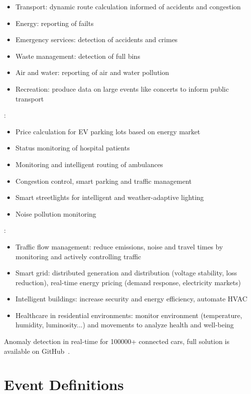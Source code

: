 \documentclass[]{scrartcl}
\begin{document}
\cite[p.~7~f.]{Petrolo.2017}
\begin{itemize}
	\item Transport: dynamic route calculation informed of accidents and congestion
	\item Energy: reporting of failts
	\item Emergency services: detection of accidents and crimes
	\item Waste management: detection of full bins
	\item Air and water: reporting of air and water pollution
	\item Recreation: produce data on large events like concerts to inform public transport
\end{itemize}

\cite[p.~8~ff.]{Alavi.2018}:
\begin{itemize}
	\item Price calculation for EV parking lots based on energy market
	\item Status monitoring of hospital patients
	\item Monitoring and intelligent routing of ambulances
	\item Congestion control, smart parking and traffic management
	\item Smart streetlights for intelligent and weather-adaptive lighting
	\item Noise pollution monitoring
\end{itemize}

\cite[p.~209~ff.]{Angelakis.2017}:
\begin{itemize}
	\item Traffic flow management: reduce emissions, noise and travel times by monitoring and actively controlling traffic
	\item Smart grid: distributed generation and distribution (voltage stability, loss reduction), real-time energy pricing (demand response, electricity markets)
	\item Intelligent buildings: increase security and energy efficiency, automate HVAC
	\item Healthcare in residential environments:  monitor environment (temperature, humidity, luminosity...) and movements to analyze health and well-being
\end{itemize}

Anomaly detection in real-time for 100000+ connected cars, full solution is available on GitHub~\cite{Wahner.2019}.

\section{Event Definitions}
\end{document}
